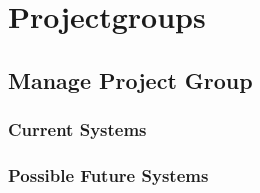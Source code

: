 \section{Projectgroups}
\label{sec:projectgroups}
\subsection{Manage Project Group}
\subsubsection{Current Systems}
\subsubsection{Possible Future Systems}





\begin{comment}
\todo{Undersøgelse af: "`Hvem skal oprette projektgrupperne"' }
\todo{Kom frem til at vi skal interview administrativt personale for at finde ud af hvordan grupper bliver brugt i praksis}
\subsection{Interviews}
\todo{Fortæl om følgende interviews
-Thomas Rybjerg
-Lene Even
-Jette og Pia
-Morten Andersen
-Mikael Møller} 
\end{comment}

